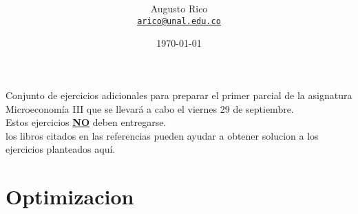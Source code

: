 \documentclass[11pt]{article}
\title{\text{Microeconomia III - Preparacion Primer Parcial}
}
\author{Augusto Rico\\%
    \href{mailto:arico@unal.edu.co}{\texttt{arico@unal.edu.co}}
    }
\date{\today}
\begin{document}
\maketitle


\begin{flushleft}
    Conjunto de ejercicios adicionales para preparar el primer parcial de la asignatura Microeconomía III que se llevará a cabo el viernes 29 de septiembre.\\
    Estos ejercicios \underline{\textbf{NO}} deben entregarse.\\
    los libros citados en las referencias pueden ayudar a obtener solucion a los ejercicios planteados aquí.
\end{flushleft}

\section{Optimizacion}
\end{document}
